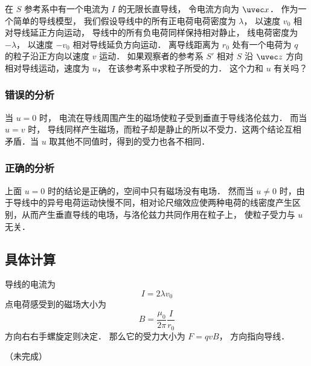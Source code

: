 
\begin{issues}
\issueDraft
\end{issues}



在 $S$ 参考系中有一个电流为 $I$ 的无限长直导线， 令电流方向为 $\uvec x$． 作为一个简单的导线模型， 我们假设导线中的所有正电荷电荷密度为 $\lambda$， 以速度 $v_0$ 相对导线延正方向运动， 导线中的所有负电荷同样保持相对静止， 线电荷密度为 $-\lambda$，  以速度 $-v_0$ 相对导线延负方向运动． 离导线距离为 $r_0$ 处有一个电荷为 $q$ 的粒子沿正方向以速度 $v$ 运动． 如果观察者的参考系 $S'$ 相对 $S$ 沿 $\uvec z$ 方向相对导线运动，速度为 $u$， 在该参考系中求粒子所受的力． 这个力和 $u$ 有关吗？


\subsubsection{错误的分析}
当 $u = 0$ 时， 电流在导线周围产生的磁场使粒子受到垂直于导线洛伦兹力． 而当 $u = v$ 时， 导线同样产生磁场，而粒子却是静止的所以不受力．这两个结论互相矛盾．当 $u$ 取其他不同值时，得到的受力也各不相同．

\subsubsection{正确的分析}
上面 $u = 0$ 时的结论是正确的，空间中只有磁场没有电场． 然而当 $u \ne 0$ 时，由于导线中的异号电荷运动快慢不同，相对论尺缩效应使两种电荷的线密度产生区别，从而产生垂直导线的电场，与洛伦兹力共同作用在粒子上， 使粒子受力与 $u$ 无关．

\subsection{具体计算}
导线的电流为
\begin{equation}
I = 2\lambda v_0
\end{equation}
点电荷感受到的磁场大小为
\begin{equation}
B = \frac{\mu_0}{2\pi} \frac{I}{r_0}
\end{equation}
方向右右手螺旋定则决定． 那么它的受力大小为 $F = q v B$， 方向指向导线．



（未完成）
